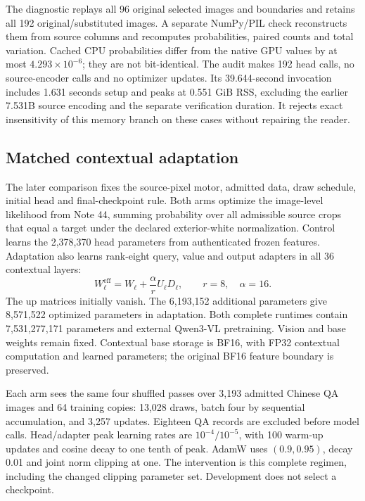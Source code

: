 The diagnostic replays all 96 original selected images and boundaries and
retains all 192 original/substituted images. A separate NumPy/PIL check
reconstructs them from source columns and recomputes probabilities, paired
counts and total variation. Cached CPU probabilities differ from the native
GPU values by at most $4.293\times10^{-6}$; they are not bit-identical.
The audit makes 192 head calls, no source-encoder calls and no optimizer
updates. Its 39.644-second invocation includes 1.631 seconds setup and peaks
at 0.551 GiB RSS, excluding the earlier 7.531B source encoding and the
separate verification duration. It rejects exact insensitivity of this
memory branch on these cases without repairing the reader.

\subsection*{Matched contextual adaptation}
The later comparison fixes the source-pixel motor, admitted data, draw
schedule, initial head and final-checkpoint rule. Both arms optimize the
image-level likelihood from Note 44, summing probability over all admissible
source crops that equal a target under the declared exterior-white
normalization. Control learns the 2,378,370 head parameters from authenticated
frozen features. Adaptation also learns rank-eight query, value and output
adapters in all 36 contextual layers:
\[
 W_\ell^{\mathrm{eff}}
   =W_\ell+\frac{\alpha}{r}U_\ell D_\ell,
 \qquad r=8,\quad \alpha=16 .
\]
The up matrices initially vanish. The 6,193,152 additional parameters give
8,571,522 optimized parameters in adaptation. Both complete runtimes contain
7,531,277,171 parameters and external Qwen3-VL pretraining. Vision and base
weights remain fixed. Contextual base storage is BF16, with FP32 contextual
computation and learned parameters; the original BF16 feature boundary is
preserved.

Each arm sees the same four shuffled passes over 3,193 admitted Chinese QA
images and 64 training copies: 13,028 draws, batch four by sequential
accumulation, and 3,257 updates. Eighteen QA records are excluded before model
calls. Head/adapter peak learning rates are $10^{-4}/10^{-5}$, with 100
warm-up updates and cosine decay to one tenth of peak. AdamW uses
$(0.9,0.95)$, decay 0.01 and joint norm clipping at one. The intervention is
this complete regimen, including the changed clipping parameter set.
Development does not select a checkpoint.

